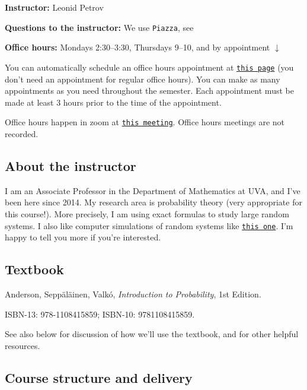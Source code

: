 \documentclass[oneside,11pt]{amsart}
\begin{document}
\bigskip

	\textbf{Instructor:} Leonid Petrov

	\textbf{Questions to the instructor:} We use \texttt{Piazza}, see 

	\textbf{Office hours:} 
	Mondays 2:30--3:30, 
	Thursdays 9--10,
	and by appointment $\downarrow$
	
	You can automatically schedule an office hours appointment 
	at \href{https://lpetrov.cc/teaching/}{\texttt{this page}} (you don't need an appointment for 
	regular office hours).
	You can make as many appointments as you need throughout the semester. Each appointment
	must be made at least 3 hours prior to the time of the appointment.

	Office hours happen in zoom at \href{https://virginia.zoom.us/j/96380060116?pwd=eFZoc0ZOc2JmRWw3R0o4WkpSMHVqUT09}{\texttt{this meeting}}.
	Office hours meetings are not recorded.
	
\subsection{About the instructor}
I am an Associate Professor in the Department of Mathematics at UVA, and I've
been here since 2014. My research area is probability theory (very appropriate
for this course!). More precisely, I am using exact formulas to study large
random systems. I also like computer simulations of random systems like 
\href{https://d3m0khvr0ybm92.cloudfront.net/img/blog/heart/UVA_colors_small.png}{\texttt{this one}}.
I'm happy to tell you more if you're
interested.

\subsection{Textbook}
Anderson, Sepp\"al\"ainen, Valk\'o, \emph{Introduction to Probability}, 1st Edition.

ISBN-13: 978-1108415859; 
ISBN-10: 9781108415859.

See also  below for discussion 
of how we'll use the textbook,
and for other helpful resources.

\subsection{Course structure and delivery}
\end{document}
